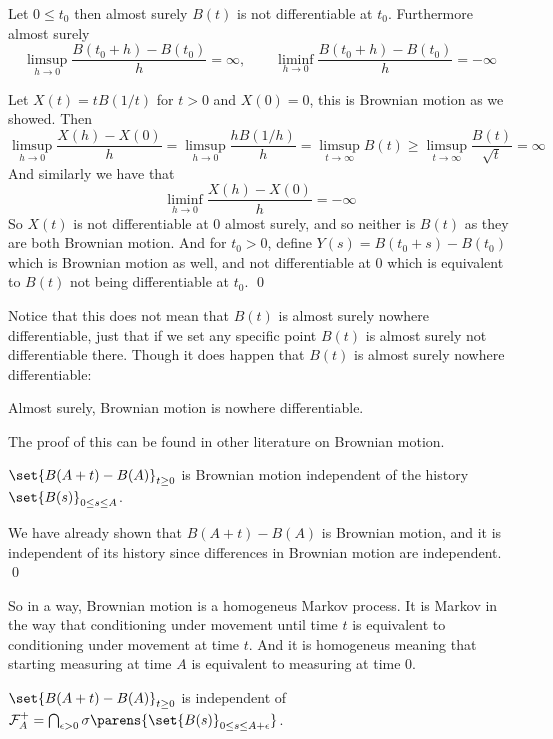 \bthrm

    Let $0\leq t_0$ then almost surely $B(t)$ is not differentiable at $t_0$.
    Furthermore almost surely
    $$ \limsup_{h\to0}\frac{B(t_0+h) - B(t_0)}h = \infty,\qquad \liminf_{h\to0}\frac{B(t_0+h) - B(t_0)}h = -\infty $$

\ethrm

Let $X(t)=tB(1/t)$ for $t>0$ and $X(0)=0$, this is Brownian motion as we showed.
Then
$$ \limsup_{h\to0}\frac{X(h) - X(0)}h = \limsup_{h\to0}\frac{hB(1/h)}h = \limsup_{t\to\infty}B(t) \geq \limsup_{t\to\infty}\frac{B(t)}{\sqrt t} = \infty $$
And similarly we have that
$$ \liminf_{h\to0}\frac{X(h) - X(0)}h = -\infty $$
So $X(t)$ is not differentiable at $0$ almost surely, and so neither is $B(t)$ as they are both Brownian motion.
And for $t_0>0$, define $Y(s)=B(t_0+s)-B(t_0)$ which is Brownian motion as well, and not differentiable at $0$ which is equivalent to $B(t)$ not being differentiable at $t_0$.
\qed

Notice that this does not mean that $B(t)$ is almost surely nowhere differentiable, just that if we set any specific point $B(t)$ is almost surely not differentiable there.
Though it does happen that $B(t)$ is almost surely nowhere differentiable:

\bthrm[title={Paley, Wiener, Zygmund}, name=pwz]

    Almost surely, Brownian motion is nowhere differentiable.

\ethrm

The proof of this can be found in other literature on Brownian motion.

\bthrm

    $\set{B(A+t) - B(A)}_{t\geq0}$ is Brownian motion independent of the history $\set{B(s)}_{0\leq s\leq A}$.

\ethrm

We have already shown that $B(A+t)-B(A)$ is Brownian motion, and it is independent of its history since differences in Brownian motion are independent.
\qed

So in a way, Brownian motion is a homogeneus Markov process.
It is Markov in the way that conditioning under movement until time $t$ is equivalent to conditioning under movement at time $t$.
And it is homogeneus meaning that starting measuring at time $A$ is equivalent to measuring at time $0$.

\bthrm

    $\set{B(A+t)-B(A)}_{t\geq0}$ is independent of ${\cal F}_A^+=\bigcap_{\epsilon>0}\sigma\parens{\set{B(s)}_{0\leq s\leq A+\epsilon}}$.

